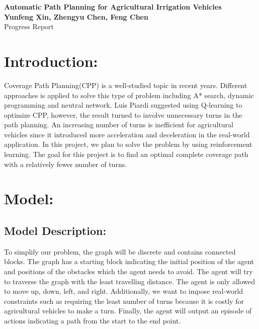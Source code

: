 \documentclass{article}
\begin{document}
	\begin{center}
    
		\LARGE{\textbf{Automatic Path Planning for Agricultural Irrigation Vehicles}} \\
        \vspace{1em}
        \normalsize\textbf{Yunfeng Xin, Zhengyu Chen, Feng Chen} \\
        \vspace{1em}
        \large{Progress Report} \\
        \vspace{1em}
     
	\end{center}
    \begin{normalsize}
    
    	\section{Introduction:}
        
            Coverage Path Planning(CPP) is a well-studied topic in recent years. Different approaches is applied to solve this type of problem including A* search\cite{b1}, dynamic programming\cite{b2} and neutral network\cite{b3}. Luis Piardi\cite{b4} suggested using Q-learning to optimize CPP, however, the result turned to involve unnecessary turns in the path planning. An increasing number of turns is inefficient for agricultural vehicles since it introduced more acceleration and deceleration in the real-world application. In this project, we plan to solve the problem by using reinforcement learning. The goal for this project is to find an optimal complete coverage path with a relatively fewer number of turns. 
      
		\section{Model:}
		    \subsection{Model Description:}
		    
		        To simplify our problem, the graph will be discrete and contains connected blocks. The graph has a starting block indicating the initial position of the agent and positions of the obstacles which the agent needs to avoid. The agent will try to traverse the graph with the least travelling distance. The agent is only allowed to move up, down, left, and right. Additionally, we want to impose real-world constraints such as requiring the least number of turns because it is costly for agricultural vehicles to make a turn. Finally, the agent will output an episode of actions indicating a path from the start to the end point.
		        

\end{normalsize}
\end{document}

